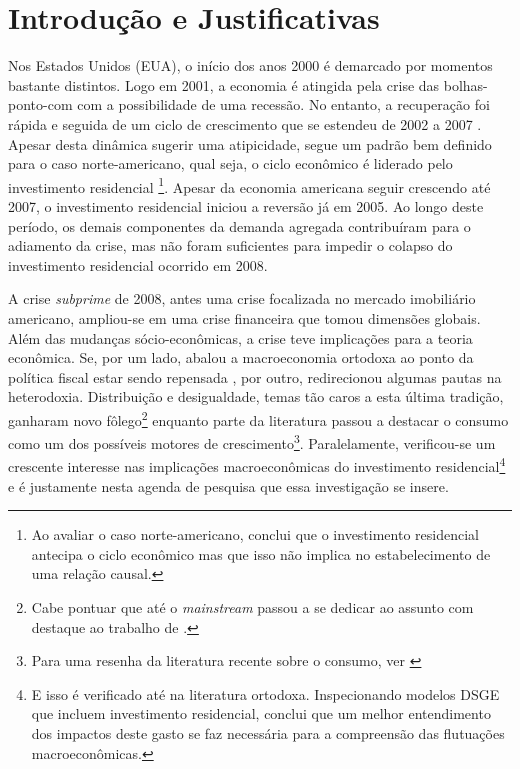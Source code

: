 \section{Introdução e Justificativas}\label{Intro}





Nos Estados Unidos (EUA), o início dos anos 2000 é demarcado por momentos bastante distintos. Logo em 2001, a economia é atingida pela crise das bolhas-ponto-com com a possibilidade de uma recessão. No entanto, a recuperação foi rápida e seguida de um ciclo de crescimento que se estendeu de 2002 a 2007 \cite{cagnin_o_2007}. Apesar desta dinâmica sugerir uma atipicidade, segue um padrão bem definido para o caso norte-americano, qual seja, o ciclo econômico é liderado pelo investimento residencial \cites{green_follow_1997}{leamer_housing_2007}{fiebiger_trend_2017}\footnote{
	Ao avaliar o caso norte-americano, \textcite{green_follow_1997} conclui que o investimento residencial antecipa o ciclo econômico mas que isso não implica no estabelecimento de uma relação causal. 
}. Apesar da economia americana seguir crescendo até 2007, o investimento residencial iniciou a reversão já em 2005. Ao longo deste período, os demais componentes da demanda agregada contribuíram para o adiamento da crise, mas não foram suficientes para impedir o colapso do investimento residencial ocorrido em 2008. 

A crise \textit{subprime} de 2008, antes uma crise focalizada no mercado imobiliário americano, ampliou-se em uma crise financeira que tomou dimensões globais. Além das mudanças sócio-econômicas, a crise teve implicações para a teoria econômica. Se, por um lado, abalou a macroeconomia ortodoxa ao ponto da política fiscal estar sendo repensada \cite{blanchard_rethinking_2017}, por outro, redirecionou algumas pautas na heterodoxia. Distribuição e desigualdade, temas tão caros a esta última tradição, ganharam novo fôlego\footnote{Cabe pontuar que até o \textit{mainstream} passou a se dedicar ao assunto com destaque ao trabalho de \textcite{piketty_o_2014}.} \cites{carvalho_personal_2016}{ederer_will_2019} enquanto parte da literatura passou a destacar o consumo como um dos possíveis motores de crescimento\footnote{Para uma resenha da literatura recente sobre o consumo, ver \textcite{brochier_macroeconomics_2017}}. Paralelamente, verificou-se um crescente interesse nas implicações macroeconômicas do investimento residencial\footnote{E isso é verificado até na literatura ortodoxa. Inspecionando modelos DSGE que incluem investimento residencial, \textcite{iacoviello_housing_2010} conclui que um melhor entendimento dos impactos deste gasto se faz necessária para a compreensão das flutuações macroeconômicas.} \cites{teixeira_crescimento_2015}{fiebiger_semi-autonomous_2018} e é justamente nesta agenda de pesquisa que essa investigação se insere. 

